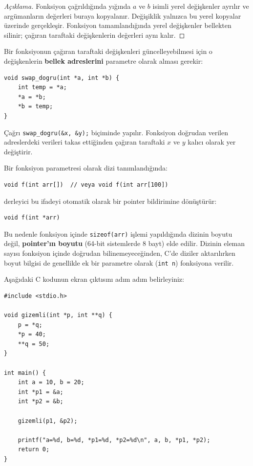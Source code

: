 \begin{proof}[Açıklama]
Fonksiyon çağrıldığında yığında $a$ ve $b$ isimli yerel değişkenler ayrılır ve argümanların değerleri buraya kopyalanır. Değişiklik yalnızca bu yerel kopyalar üzerinde gerçekleşir. Fonksiyon tamamlandığında yerel değişkenler bellekten silinir; çağıran taraftaki değişkenlerin değerleri aynı kalır.
\end{proof}

Bir fonksiyonun çağıran taraftaki değişkenleri güncelleyebilmesi için o değişkenlerin \textbf{bellek adreslerini} parametre olarak alması gerekir:

\begin{lstlisting}[language=CTemel]
void swap_dogru(int *a, int *b) {
    int temp = *a;
    *a = *b;
    *b = temp;
}
\end{lstlisting}

Çağrı \texttt{swap\_dogru(\&x, \&y);} biçiminde yapılır. Fonksiyon doğrudan verilen adreslerdeki verileri takas ettiğinden çağıran taraftaki $x$ ve $y$ kalıcı olarak yer değiştirir.

\begin{definition}
Bir fonksiyon parametresi olarak dizi tanımlandığında:
\begin{lstlisting}[language=CTemel]
void f(int arr[])  // veya void f(int arr[100])
\end{lstlisting}
derleyici bu ifadeyi otomatik olarak bir pointer bildirimine dönüştürür:
\begin{lstlisting}[language=CTemel]
void f(int *arr)
\end{lstlisting}
Bu nedenle fonksiyon içinde \texttt{sizeof(arr)} işlemi yapıldığında dizinin boyutu değil, \textbf{pointer'ın boyutu} (64-bit sistemlerde 8 bayt) elde edilir. Dizinin eleman sayısı fonksiyon içinde doğrudan bilinemeyeceğinden, C'de diziler aktarılırken boyut bilgisi de genellikle ek bir parametre olarak (\texttt{int n}) fonksiyona verilir.
\end{definition}

\begin{example}
Aşağıdaki C kodunun ekran çıktısını adım adım belirleyiniz:
\begin{lstlisting}[language=CTemel]
#include <stdio.h>

void gizemli(int *p, int **q) {
    p = *q;
    *p = 40;
    **q = 50;
}

int main() {
    int a = 10, b = 20;
    int *p1 = &a;
    int *p2 = &b;
    
    gizemli(p1, &p2);
    
    printf("a=%d, b=%d, *p1=%d, *p2=%d\n", a, b, *p1, *p2);
    return 0;
}
\end{lstlisting}
\end{example}


